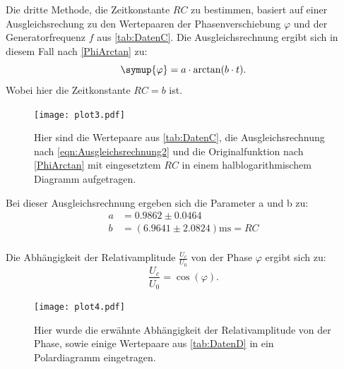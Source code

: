 Die dritte Methode, die Zeitkonstante $RC$ zu bestimmen, basiert auf einer Ausgleichsrechung zu den Wertepaaren der Phasenverschiebung $\varphi$ 
und der Generatorfrequenz $f$ aus \autoref{tab:DatenC}.
Die Ausgleichsrechnung ergibt sich in diesem Fall nach \eqref{PhiArctan} zu:
\begin{equation}
  \label{eqn:Ausgleichsrechnung2}
  \symup{\varphi} = a\cdot\arctan(b\cdot t).
\end{equation}
Wobei hier die Zeitkonstante $RC = b$ ist.
\begin{figure}
  \centering
  \texttt{[image: plot3.pdf]}
  \caption{Hier sind die Wertepaare aus \autoref{tab:DatenC}, die Ausgleichsrechnung nach \eqref{eqn:Ausgleichsrechnung2} und die Originalfunktion nach \eqref{PhiArctan} mit eingesetztem $RC$ in einem halblogarithmischem Diagramm aufgetragen.}
  \label{fig:plot3}
\end{figure}
Bei dieser Ausgleichsrechnung ergeben sich die Parameter a und b zu:
\begin{align*}
  a &=0.9862\pm 0.0464 \\
  b &=(6.9641\pm 2.0824) \unit{\milli\second} = RC \\
\end{align*}

Die Abhängigkeit der Relativamplitude $\frac{U_c}{U_0}$ von der Phase $\varphi$ ergibt sich zu:
\begin{equation*}
  \frac{U_c}{U_0} = \cos\left(\varphi\right).
\end{equation*}

\begin{figure}
  \centering
  \texttt{[image: plot4.pdf]}
  \caption{Hier wurde die erwähnte Abhängigkeit der Relativamplitude von der Phase, sowie einige Wertepaare aus \autoref{tab:DatenD} in ein Polardiagramm eingetragen.}
  \label{fig:plot4}
\end{figure}

